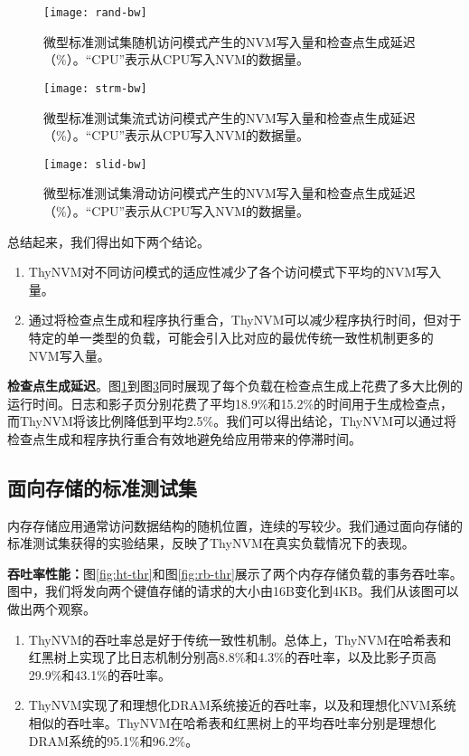 \begin{figure}[!h]
\centering
\texttt{[image: rand-bw]}\\
\caption{微型标准测试集随机访问模式产生的NVM写入量和检查点生成延迟（\%）。``CPU''表示从CPU写入NVM的数据量。}
\label{fig:rand-bw}
\end{figure}

\begin{figure}[!h]
\centering
\texttt{[image: strm-bw]}\\
\caption{微型标准测试集流式访问模式产生的NVM写入量和检查点生成延迟（\%）。``CPU''表示从CPU写入NVM的数据量。}
\label{fig:strm-bw}
\end{figure}

\begin{figure}[!h]
\centering
\texttt{[image: slid-bw]}\\
\caption{微型标准测试集滑动访问模式产生的NVM写入量和检查点生成延迟（\%）。``CPU''表示从CPU写入NVM的数据量。}
\label{fig:slid-bw}
\end{figure}

总结起来，我们得出如下两个结论。
\begin{enumerate}
\item ThyNVM对不同访问模式的适应性减少了各个访问模式下平均的NVM写入量。 
\item 通过将检查点生成和程序执行重合，ThyNVM可以减少程序执行时间，但对于特定的单一类型的负载，可能会引入比对应的最优传统一致性机制更多的NVM写入量。
\end{enumerate}

\textbf{检查点生成延迟}。图\ref{fig:rand-bw}到图\ref{fig:slid-bw}同时展现了每个负载在检查点生成上花费了多大比例的运行时间。日志和影子页分别花费了平均18.9\%和15.2\%的时间用于生成检查点，而ThyNVM将该比例降低到平均2.5\%。我们可以得出结论，ThyNVM可以通过将检查点生成和程序执行重合有效地避免给应用带来的停滞时间。 

\subsection{面向存储的标准测试集}

内存存储应用通常访问数据结构的随机位置，连续的写较少。我们通过面向存储的标准测试集获得的实验结果，反映了ThyNVM在真实负载情况下的表现。

\textbf{吞吐率性能：}图\ref{fig:ht-thr}和图\ref{fig:rb-thr}展示了两个内存存储负载的事务吞吐率。图中，我们将发向两个键值存储的请求的大小由16B变化到4KB。我们从该图可以做出两个观察。
\begin{enumerate}
\item ThyNVM的吞吐率总是好于传统一致性机制。总体上，ThyNVM在哈希表和红黑树上实现了比日志机制分别高8.8\%和4.3\%的吞吐率，以及比影子页高29.9\%和43.1\%的吞吐率。
\item ThyNVM实现了和理想化DRAM系统接近的吞吐率，以及和理想化NVM系统相似的吞吐率。ThyNVM在哈希表和红黑树上的平均吞吐率分别是理想化DRAM系统的95.1\%和96.2\%。
\end{enumerate}

